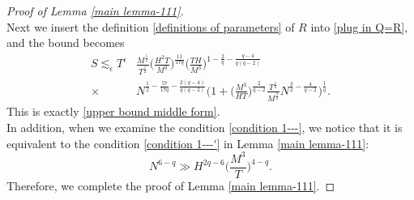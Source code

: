 \documentclass[11pt]{amsart}
\numberwithin{equation}{section}
\theoremstyle{definition}
\theoremstyle{proposition}
\begin{document}
\begin{proof} [Proof of Lemma \ref{main lemma-111}]
\begin{equation}
\end{equation}
Next we insert the definition \eqref{definitions of parameters} of $R$  into \eqref{plug in Q=R}, and the bound becomes 
\begin{equation}   \label{22}
\begin{split}
S \lesssim_\epsilon T^\epsilon & \frac{M^{\frac{5}{2}}}{T^{\frac{1}{2}}} \Big(\frac{H^2 T}{M^3}\Big)^{\frac{11}{17q}} \Big(\frac{TH}{M^3}\Big)^{1-\frac{2}{q}-\frac{q-4}{q(q-2)}}  
\\ \times &   N^{\frac{1}{2}-\frac{57}{17q}-\frac{2(q-4)}{q(q-2)}}\Big(1+\Big(\frac{M^3}{HT}\Big)^{\frac{2}{q-2}}\frac{T^{\frac{1}{2}}}{M^{\frac{3}{2}}} N^{\frac{3}{2}-\frac{4}{q-2}}\Big)^{\frac{1}{q}}. 
\end{split}    
\end{equation}
This is exactly \eqref{upper bound middle form}. \\

In addition, when we examine the condition \eqref{condition 1---}, we notice that it is equivalent to the condition \eqref{condition 1---'} in Lemma \ref{main lemma-111}:
\begin{equation}  \label{condition of N repeated}
N^{6-q}\gg H^{2q-6} \Big(\frac{M^3}{T}\Big)^{4-q}.    
\end{equation}
Therefore, we complete the proof of Lemma \ref{main lemma-111}.
\end{proof}
\end{document}
